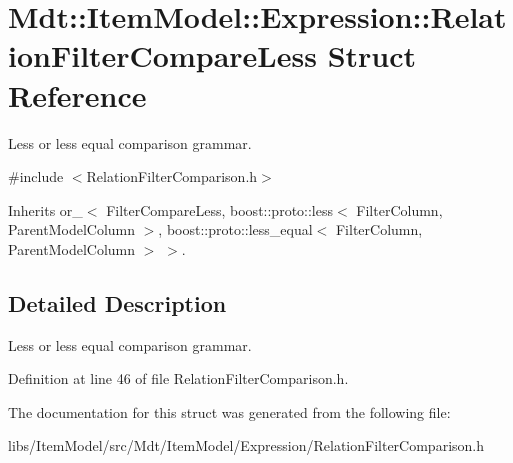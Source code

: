 \hypertarget{struct_mdt_1_1_item_model_1_1_expression_1_1_relation_filter_compare_less}{}\section{Mdt\+:\+:Item\+Model\+:\+:Expression\+:\+:Relation\+Filter\+Compare\+Less Struct Reference}
\label{struct_mdt_1_1_item_model_1_1_expression_1_1_relation_filter_compare_less}


Less or less equal comparison grammar.  




{\ttfamily \#include $<$Relation\+Filter\+Comparison.\+h$>$}



Inherits or\+\_\+$<$ Filter\+Compare\+Less, boost\+::proto\+::less$<$ Filter\+Column, Parent\+Model\+Column $>$, boost\+::proto\+::less\+\_\+equal$<$ Filter\+Column, Parent\+Model\+Column $>$ $>$.



\subsection{Detailed Description}
Less or less equal comparison grammar. 

Definition at line 46 of file Relation\+Filter\+Comparison.\+h.



The documentation for this struct was generated from the following file\+:\begin{DoxyCompactItemize}
\item 
libs/\+Item\+Model/src/\+Mdt/\+Item\+Model/\+Expression/Relation\+Filter\+Comparison.\+h\end{DoxyCompactItemize}
